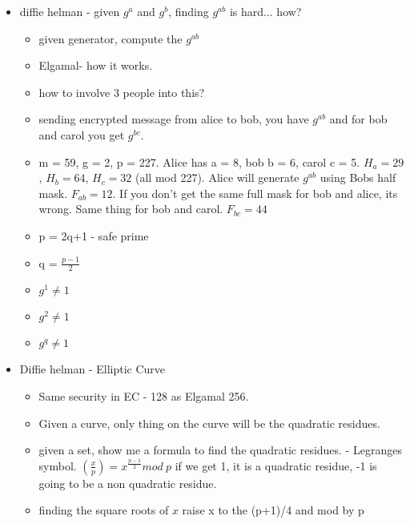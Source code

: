 \documentclass[12pt]{amsart}
\begin{document}
\begin{itemize}
\item{}diffie helman - given $g^a$ and $g^b$, finding $g^{ab}$ is hard... how?\\
	\begin{itemize}
	\item{}given generator, compute the $g^{ab}$\\
	\item{}Elgamal- how it works.\\
	\item{}how to involve 3 people into this?\\
	\item{}sending encrypted message from alice to bob, you have $g^{ab}$ and for bob and carol you get $g^{bc}$.\\
	\item{}m = 59, g = 2, p = 227.  Alice has a = 8, bob b = 6, carol c = 5.  $H_a = 29$, $H_b = 64$, $H_c = 32$ (all mod 227).  Alice will generate $g^{ab}$ using Bobs half mask. $F_{ab} = 12$.  If you don't get the same full mask for bob and alice, its wrong.  Same thing for bob and carol.  $F_{bc} = 44$\\
	\item{}p = 2q+1 - safe prime\
	\item{}q = $\frac{p-1}{2}$\\
	\item{}$g^1 \neq 1$\\
	\item{}$g^2 \neq 1$\\
	\item{}$g^q \neq 1$\\
	\end{itemize}
\item{}Diffie helman - Elliptic Curve\\
	\begin{itemize}
	\item{}Same security in EC - 128 as Elgamal 256.\\
	\item{}Given a curve, only thing on the curve will be the quadratic residues.\\
	\item{}given a set, show me a formula to find the quadratic residues. - Legranges symbol. $(\frac{x}{p}) = x ^{\frac{p-1}{2}} mod\ p$ if we get 1, it is a quadratic residue, -1 is going to be a non quadratic residue.\\
	\item{}finding the square roots of $x$ raise x to the (p+1)/4 and mod by p\\

\end{itemize}
\end{itemize}
\end{document}
